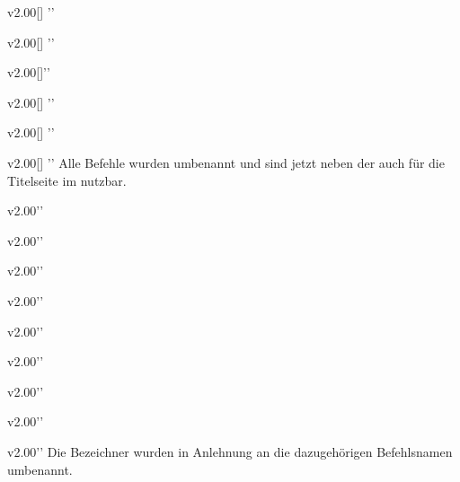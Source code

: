 \begin{Entity}{}
\begin{Obsolete}{v2.00}{[]}%
  ''
\begin{Obsolete}{v2.00}{[]}%
  ''
\begin{Obsolete}{v2.00}{[]}''
\begin{Obsolete}{v2.00}{[]}%
  ''
\begin{Obsolete}{v2.00}{[]}%
  ''
\begin{Obsolete}{v2.00}{[]}%
  ''
\printdeclarationlist%
%
Alle Befehle wurden umbenannt und sind jetzt neben der \taskname{} auch für die 
Titelseite im \CD nutzbar.
\end{Obsolete}
\end{Obsolete}
\end{Obsolete}
\end{Obsolete}
\end{Obsolete}
\end{Obsolete}

\begin{Obsolete}{v2.00}{}''
\begin{Obsolete}{v2.00}{}''
\begin{Obsolete}{v2.00}{}''
\begin{Obsolete}{v2.00}{}''
\begin{Obsolete}{v2.00}{}''
\begin{Obsolete}{v2.00}{}''
\begin{Obsolete}{v2.00}{}''
\begin{Obsolete}{v2.00}{}''
\begin{Obsolete}{v2.00}{}''
\printdeclarationlist%
%
Die Bezeichner wurden in Anlehnung an die dazugehörigen Befehlsnamen umbenannt.
\end{Obsolete}
\end{Obsolete}
\end{Obsolete}
\end{Obsolete}
\end{Obsolete}
\end{Obsolete}
\end{Obsolete}
\end{Obsolete}
\end{Obsolete}
\end{Entity}


